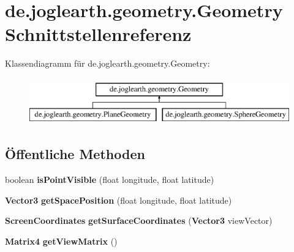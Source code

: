 \section{de.\-joglearth.\-geometry.\-Geometry \-Schnittstellenreferenz}
\label{interfacede_1_1joglearth_1_1geometry_1_1_geometry}
\-Klassendiagramm für de.\-joglearth.\-geometry.\-Geometry\-:\begin{figure}[H]
\begin{center}
\leavevmode
\includegraphics[height=2.000000cm]{interfacede_1_1joglearth_1_1geometry_1_1_geometry}
\end{center}
\end{figure}
\subsection*{Öffentliche \-Methoden}
\begin{DoxyCompactItemize}
\item 
boolean {\bfseries is\-Point\-Visible} (float longitude, float latitude)\label{interfacede_1_1joglearth_1_1geometry_1_1_geometry_a93795cd836dcab82a988dbe551bebe66}

\item 
{\bf \-Vector3} {\bfseries get\-Space\-Position} (float longitude, float latitude)\label{interfacede_1_1joglearth_1_1geometry_1_1_geometry_a6ea8d2148fc3396d7ed2c6be45c7e4cc}

\item 
{\bf \-Screen\-Coordinates} {\bfseries get\-Surface\-Coordinates} ({\bf \-Vector3} view\-Vector)\label{interfacede_1_1joglearth_1_1geometry_1_1_geometry_a65efb18a90aeacc6ba446c3cbf9f4787}

\item 
{\bf \-Matrix4} {\bfseries get\-View\-Matrix} ()\label{interfacede_1_1joglearth_1_1geometry_1_1_geometry_a30f45d30257e8fc7e9d6f91cf846cdda}

\end{DoxyCompactItemize}
